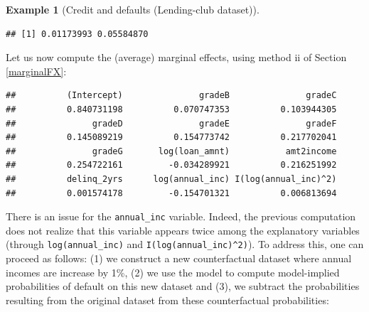 \documentclass[
  12pt,
]{book}
\newenvironment{Shaded}{\begin{snugshade}}{\end{snugshade}}
\newcommand{\AttributeTok}[1]{\textcolor[rgb]{0.77,0.63,0.00}{#1}}
\newcommand{\CommentTok}[1]{\textcolor[rgb]{0.56,0.35,0.01}{\textit{#1}}}
\newcommand{\ConstantTok}[1]{\textcolor[rgb]{0.00,0.00,0.00}{#1}}
\newcommand{\FloatTok}[1]{\textcolor[rgb]{0.00,0.00,0.81}{#1}}
\newcommand{\FunctionTok}[1]{\textcolor[rgb]{0.00,0.00,0.00}{#1}}
\newcommand{\NormalTok}[1]{#1}
\newcommand{\OtherTok}[1]{\textcolor[rgb]{0.56,0.35,0.01}{#1}}
\newcommand{\SpecialCharTok}[1]{\textcolor[rgb]{0.00,0.00,0.00}{#1}}
\newcommand{\StringTok}[1]{\textcolor[rgb]{0.31,0.60,0.02}{#1}}
\theoremstyle{definition}
\theoremstyle{definition}
\newtheorem{example}{Example}[chapter]
\theoremstyle{definition}
\theoremstyle{definition}
\theoremstyle{remark}
\begin{document}
\begin{example}[Credit and defaults (Lending-club dataset)]
\begin{verbatim}
## [1] 0.01173993 0.05584870
\end{verbatim}

Let us now compute the (average) marginal effects, using method ii of Section \ref{marginalFX}:

\begin{Shaded}
\end{Shaded}

\begin{verbatim}
##          (Intercept)               gradeB               gradeC 
##          0.840731198          0.070747353          0.103944305 
##               gradeD               gradeE               gradeF 
##          0.145089219          0.154773742          0.217702041 
##               gradeG       log(loan_amnt)           amt2income 
##          0.254722161         -0.034289921          0.216251992 
##          delinq_2yrs      log(annual_inc) I(log(annual_inc)^2) 
##          0.001574178         -0.154701321          0.006813694
\end{verbatim}

There is an issue for the \texttt{annual\_inc} variable. Indeed, the previous computation does not realize that this variable appears twice among the explanatory variables (through \texttt{log(annual\_inc)} and \texttt{I(log(annual\_inc)\^{}2)}). To address this, one can proceed as follows: (1) we construct a new counterfactual dataset where annual incomes are increase by 1\%, (2) we use the model to compute model-implied probabilities of default on this new dataset and (3), we subtract the probabilities resulting from the original dataset from these counterfactual probabilities:

\begin{Shaded}
\end{Shaded}


\end{example}
\end{document}
